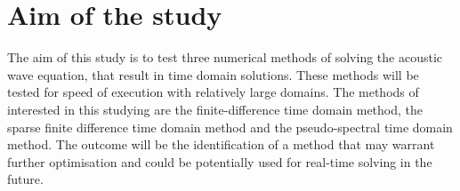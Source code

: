 

\section{Aim of the study}

The aim of this study is to test three numerical methods of solving the acoustic wave equation, that result in time domain solutions. These methods will be tested for speed of execution with relatively large domains. The methods of interested in this studying are the finite-difference time domain method, the sparse finite difference time domain method and the pseudo-spectral time domain method. The outcome will be the identification of a method that may warrant further optimisation and could be potentially used for real-time solving in the future.\\



